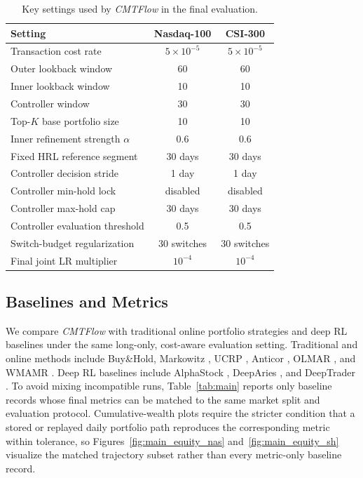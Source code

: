 \documentclass[letterpaper]{article} %
\begin{document}
\begin{table}[t]
\centering
\caption{Key settings used by \textit{CMTFlow} in the final evaluation.}
\label{tab:hyperparam}
\small
\setlength{\tabcolsep}{6pt}
\begin{tabular}{lcc}
\toprule
\textbf{Setting} & \textbf{Nasdaq-100} & \textbf{CSI-300} \\
\midrule
Transaction cost rate & \(5\times10^{-5}\) & \(5\times10^{-5}\) \\
Outer lookback window & 60 & 60 \\
Inner lookback window & 10 & 10 \\
Controller window & 30 & 30 \\
Top-\(K\) base portfolio size & 10 & 10 \\
Inner refinement strength \(\alpha\) & 0.6 & 0.6 \\
Fixed HRL reference segment & 30 days & 30 days \\
Controller decision stride & 1 day & 1 day \\
Controller min-hold lock & disabled & disabled \\
Controller max-hold cap & 30 days & 30 days \\
Controller evaluation threshold & 0.5 & 0.5 \\
Switch-budget regularization & 30 switches & 30 switches \\
Final joint LR multiplier & \(10^{-4}\) & \(10^{-4}\) \\
\bottomrule
\end{tabular}
\end{table}

\subsection{Baselines and Metrics}

We compare \textit{CMTFlow} with traditional online portfolio strategies and deep RL baselines under the same long-only, cost-aware evaluation setting. Traditional and online methods include Buy\&Hold, Markowitz \citep{MVO}, UCRP \citep{UCRP}, Anticor \citep{ANTICOR}, OLMAR \citep{OLMAR}, and WMAMR \citep{WMAMR}. Deep RL baselines include AlphaStock \citep{alphastock}, DeepAries \citep{deeparies2025}, and DeepTrader \citep{6}. To avoid mixing incompatible runs, Table~\ref{tab:main} reports only baseline records whose final metrics can be matched to the same market split and evaluation protocol. Cumulative-wealth plots require the stricter condition that a stored or replayed daily portfolio path reproduces the corresponding metric within tolerance, so Figures~\ref{fig:main_equity_nas} and~\ref{fig:main_equity_sh} visualize the matched trajectory subset rather than every metric-only baseline record.
\end{document}
